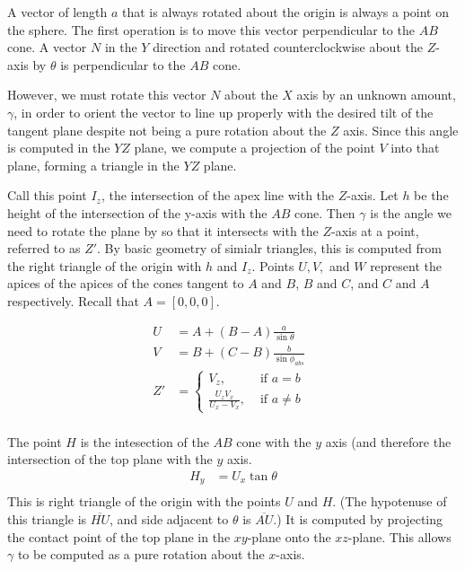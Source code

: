 \documentclass{article}
\begin{document}
A vector of length $a$ that is always rotated about the origin is always a point on the sphere.
The first operation is to move this vector perpendicular to the $AB$ cone.
A vector $N$ in the $Y$ direction and rotated counterclockwise
about the $Z$-axis by $\theta$ is perpendicular to the $AB$ cone.

However, we must rotate this vector $N$ about the $X$ axis by an unknown amount, $\gamma$, in order
to orient the vector to line up properly with the
desired tilt of the tangent plane despite not being a pure rotation about the $Z$ axis.
Since this angle is computed in the $YZ$ plane, we compute a projection of the point $V$ into
that plane, forming a triangle in the $YZ$ plane.

Call this point $I_z$, the intersection
of the apex line with the $Z$-axis. Let $h$ be the height of the intersection of the y-axis with the $AB$ cone.
Then $\gamma$ is the angle we need to rotate the plane by so that it intersects with the
$Z$-axis at a point, referred to as $Z'$.
By basic geometry of simialr triangles, this is computed from the right triangle of the origin with $h$ and $I_z$.
Points $U, V, $ and $W$ represent the apices of the apices of the cones tangent to $A$ and $B$, $B$ and $C$,
and $C$ and $A$ respectively. Recall that $A = [0,0,0]$.

\begin{align}
  U &= A + (B-A) \frac{a}{\sin{\theta}} \\
  V &= B + (C-B) \frac{b}{\sin{\phi_{abs}}} \\
  Z'&= \begin{cases}
    V_z, & \text{ if $a = b$ } \\
    \frac{U_z V_x}{U_x - V_x}, & \text{ if  $a \neq b$}
  \end{cases}
  \label{eq:zprime} \\
\end{align}

The point $H$ is the intesection of the $AB$ cone with the $y$ axis (and therefore the intersection
of the top plane with the $y$ axis.
\begin{align}
  H_y &= U_x \tan{\theta} \\
\end{align}
This is right triangle of the origin with the points $U$ and $H$. (The hypotenuse
of this triangle is $\overline{HU}$, and side adjacent to $\theta$ is $\overline{AU}$.)
It is computed by projecting the contact point of the top plane in the $xy$-plane
onto the $xz$-plane. This allows $\gamma$ to be computed as a pure rotation
about the $x$-axis.
\end{document}
